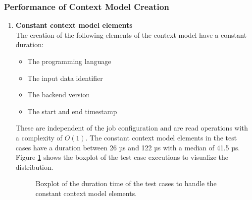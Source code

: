 \documentclass[draft,final]{vutinfth} %
\begin{document}
\subsubsection{Performance of Context Model Creation}\label{Evaluation:impact_perf_context}

\begin{enumerate}
	\item \textbf{Constant context model elements} \\
	The creation of the following elements of the context model have a constant duration: 
	\begin{itemize}
		\item The programming language
		\item The input data identifier
		\item The backend version
		\item The start and end timestamp
	\end{itemize}
	These are independent of the job configuration and are read operations with a complexity of $O(1)$. The constant context model elements in the test cases have a duration between 26 µs and 122 µs with a median of 41.5 µs. Figure \ref{fig:evaluation_perf_static_cm} shows the boxplot of the test case executions to visualize the distribution.
	\begin{figure}[!h]
		\centering
		\caption{Boxplot of the duration time of the test cases to handle the constant context model elements.}
		\label{fig:evaluation_perf_static_cm}		
	\end{figure}


\end{enumerate}
\end{document}
